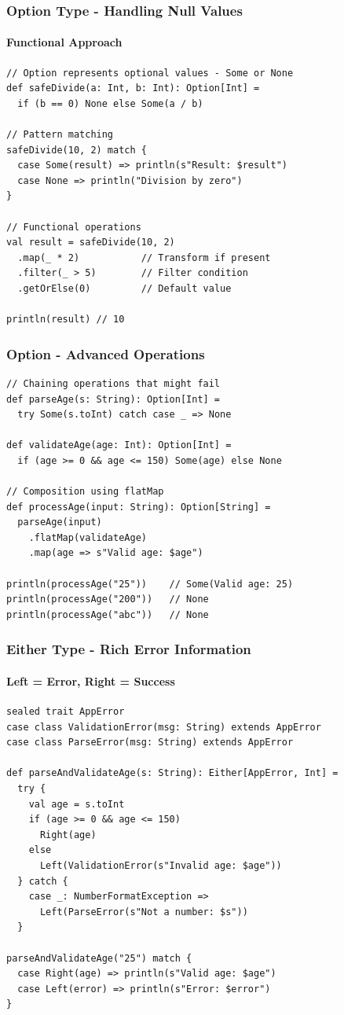\documentclass{beamer}
\begin{document}
\begin{frame}[fragile]
\frametitle{Option Type - Handling Null Values}
\framesubtitle{Functional Approach}

\begin{lstlisting}[style=scalaStyle]
// Option represents optional values - Some or None
def safeDivide(a: Int, b: Int): Option[Int] = 
  if (b == 0) None else Some(a / b)

// Pattern matching
safeDivide(10, 2) match {
  case Some(result) => println(s"Result: $result")
  case None => println("Division by zero")
}

// Functional operations
val result = safeDivide(10, 2)
  .map(_ * 2)           // Transform if present
  .filter(_ > 5)        // Filter condition
  .getOrElse(0)         // Default value

println(result) // 10
\end{lstlisting}

\end{frame}

\begin{frame}[fragile]
\frametitle{Option - Advanced Operations}

\begin{lstlisting}[style=scalaStyle]
// Chaining operations that might fail
def parseAge(s: String): Option[Int] = 
  try Some(s.toInt) catch case _ => None

def validateAge(age: Int): Option[Int] = 
  if (age >= 0 && age <= 150) Some(age) else None

// Composition using flatMap
def processAge(input: String): Option[String] = 
  parseAge(input)
    .flatMap(validateAge)
    .map(age => s"Valid age: $age")

println(processAge("25"))    // Some(Valid age: 25)
println(processAge("200"))   // None
println(processAge("abc"))   // None
\end{lstlisting}

\end{frame}

\begin{frame}[fragile]
\frametitle{Either Type - Rich Error Information}
\framesubtitle{Left = Error, Right = Success}

\begin{lstlisting}[style=scalaStyle]
sealed trait AppError
case class ValidationError(msg: String) extends AppError
case class ParseError(msg: String) extends AppError

def parseAndValidateAge(s: String): Either[AppError, Int] = 
  try {
    val age = s.toInt
    if (age >= 0 && age <= 150) 
      Right(age)
    else 
      Left(ValidationError(s"Invalid age: $age"))
  } catch {
    case _: NumberFormatException => 
      Left(ParseError(s"Not a number: $s"))
  }

parseAndValidateAge("25") match {
  case Right(age) => println(s"Valid age: $age")
  case Left(error) => println(s"Error: $error")
}
\end{lstlisting}

\end{frame}
\end{document}
